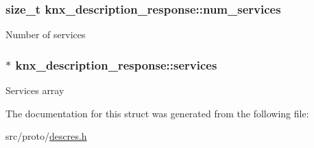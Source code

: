 \subsubsection[{\texorpdfstring{num\+\_\+services}{num_services}}]{\setlength{\rightskip}{0pt plus 5cm}size\+\_\+t knx\+\_\+description\+\_\+response\+::num\+\_\+services}\hypertarget{structknx__description__response_afdf2cfaf2090a90c01eaf745f869ceb0}{}\label{structknx__description__response_afdf2cfaf2090a90c01eaf745f869ceb0}
Number of services 
\subsubsection[{\texorpdfstring{services}{services}}]{$\ast$ knx\+\_\+description\+\_\+response\+::services}\hypertarget{structknx__description__response_abbe041d6218aac9fe89c0d7779491763}{}\label{structknx__description__response_abbe041d6218aac9fe89c0d7779491763}
Services array 

The documentation for this struct was generated from the following file\+:\begin{DoxyCompactItemize}
\item 
src/proto/\hyperlink{descres_8h}{descres.\+h}\end{DoxyCompactItemize}
